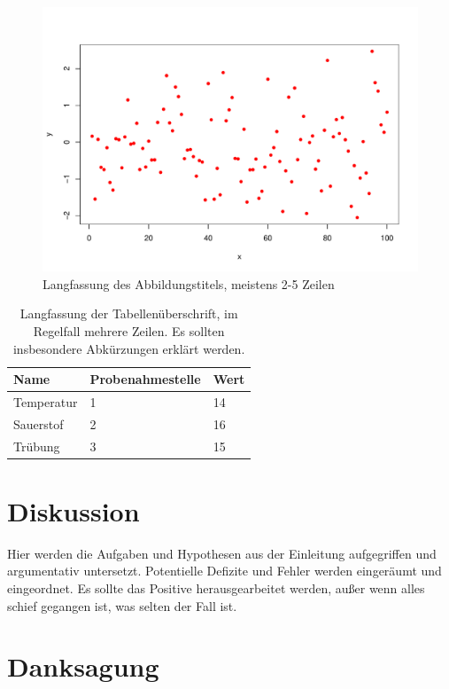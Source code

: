 \documentclass[english,ngerman,BCOR=6mm,cdgeometry=no,parskip=half,DIV=13]{tudscrreprt}
\begin{document}
\begin{figure}
	\centering
	\includegraphics[width=\textwidth]{pdf-plot.pdf}
	\caption[Kurzfassung des Abbildungstitels]{Langfassung des Abbildungstitels,
	         meistens 2-5 Zeilen}\label{fig:fig_1}
\end{figure}

\begin{table}
	\centering
	\caption[Kurzfassung der Tabellenüberschrft]{Langfassung der Tabellenüberschrift,
	        im Regelfall mehrere Zeilen. Es sollten insbesondere Abkürzungen erklärt werden.}
	\label{tab:my_label}
	\begin{tabular}{lll}\hline
		Name & Probenahmestelle & Wert\\\hline
		Temperatur & 1  & 14  \\
		Sauerstof & 2  & 16 \\
		Trübung & 3 & 15 \\ \hline
	\end{tabular}
\end{table}


\chapter{Diskussion}

Hier werden die Aufgaben und Hypothesen aus der Einleitung aufgegriffen und
argumentativ untersetzt. Potentielle Defizite und Fehler werden eingeräumt und
eingeordnet. Es sollte das Positive herausgearbeitet werden, außer wenn alles
schief gegangen ist, was selten der Fall ist.

\chapter*{Danksagung} %
\end{document}
